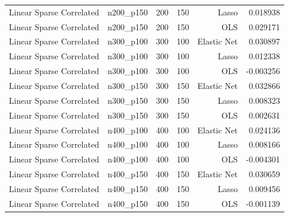 \begin{table}[!htbp]
\begin{tabular}{lrrrrr}
Linear Sparse Correlated & n200\_p150 & 200 & 150 & Lasso & 0.018938 \\
Linear Sparse Correlated & n200\_p150 & 200 & 150 & OLS & 0.029171 \\
Linear Sparse Correlated & n300\_p100 & 300 & 100 & Elastic Net & 0.030897 \\
Linear Sparse Correlated & n300\_p100 & 300 & 100 & Lasso & 0.012338 \\
Linear Sparse Correlated & n300\_p100 & 300 & 100 & OLS & -0.003256 \\
Linear Sparse Correlated & n300\_p150 & 300 & 150 & Elastic Net & 0.032866 \\
Linear Sparse Correlated & n300\_p150 & 300 & 150 & Lasso & 0.008323 \\
Linear Sparse Correlated & n300\_p150 & 300 & 150 & OLS & 0.002631 \\
Linear Sparse Correlated & n400\_p100 & 400 & 100 & Elastic Net & 0.024136 \\
Linear Sparse Correlated & n400\_p100 & 400 & 100 & Lasso & 0.008166 \\
Linear Sparse Correlated & n400\_p100 & 400 & 100 & OLS & -0.004301 \\
Linear Sparse Correlated & n400\_p150 & 400 & 150 & Elastic Net & 0.030659 \\
Linear Sparse Correlated & n400\_p150 & 400 & 150 & Lasso & 0.009456 \\
Linear Sparse Correlated & n400\_p150 & 400 & 150 & OLS & -0.001139 \\
 \hline
\end{tabular}
\end{table}


